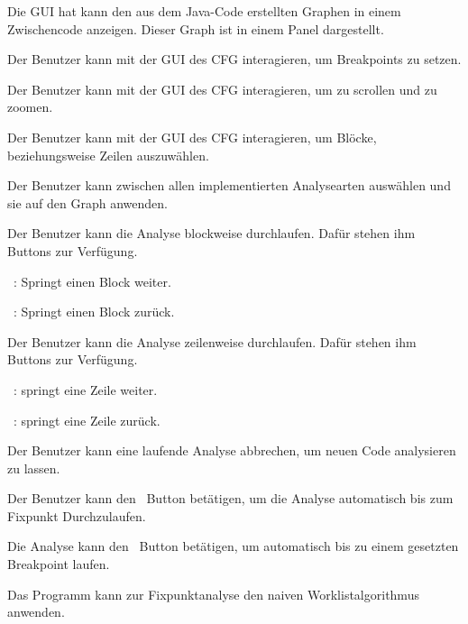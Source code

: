 Die GUI hat kann den aus dem Java-Code erstellten Graphen in einem Zwischencode anzeigen. Dieser Graph ist in einem Panel dargestellt.

Der Benutzer kann mit der GUI des CFG interagieren, um Breakpoints zu setzen.

Der Benutzer kann mit der GUI des CFG interagieren, um zu scrollen und zu zoomen.

Der Benutzer kann mit der GUI des CFG interagieren, um Blöcke, beziehungsweise Zeilen auszuwählen.

Der Benutzer kann zwischen allen implementierten Analysearten auswählen und sie auf den Graph anwenden.

Der Benutzer kann die Analyse blockweise durchlaufen. Dafür stehen ihm Buttons zur Verfügung.\par
\faFastForward\ : Springt einen Block weiter.\par
\faFastBackward\ : Springt einen Block zurück.

Der Benutzer kann die Analyse zeilenweise durchlaufen. Dafür stehen ihm Buttons zur Verfügung.\par
\faForward\ : springt eine Zeile weiter.\par
\faBackward\ : springt eine Zeile zurück.

Der Benutzer kann eine laufende Analyse abbrechen, um neuen Code analysieren zu lassen.

Der Benutzer kann den \faPlay\ Button betätigen, um die Analyse automatisch bis zum Fixpunkt Durchzulaufen.

Die Analyse kann den \faPlay\ Button betätigen, um automatisch bis zu einem gesetzten Breakpoint laufen.

Das Programm kann zur Fixpunktanalyse den naiven Worklistalgorithmus anwenden.

